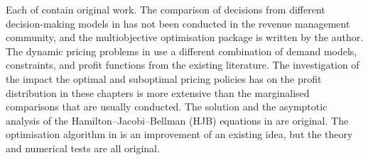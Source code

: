 \documentclass[main.tex]{subfiles}
\begin{document}
Each of
contain original work.  The comparison of decisions from different
decision-making models in  has not been conducted in
the revenue management community, and the multiobjective optimisation
package is written by the author.  The dynamic pricing problems in
 use a different combination
of demand models, constraints, and profit functions from the existing
literature.  The investigation of the impact the optimal and
suboptimal pricing policies has on the profit distribution in these
chapters is more extensive than the marginalised comparisons that are
usually conducted. The solution and the asymptotic analysis of the
Hamilton--Jacobi--Bellman (HJB)
equations in  are original.  The optimisation
algorithm in  is an improvement of an existing idea,
but the theory and numerical tests are all original.
\end{document}
